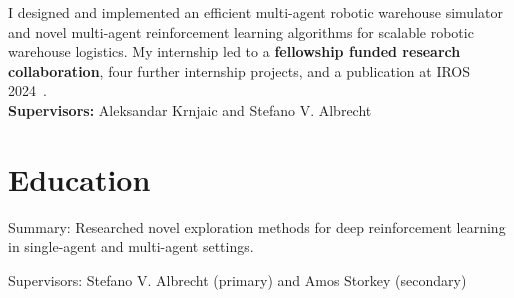 \documentclass[a4paper,12pt]{article}
\begin{document}
\begin{expblock}
    I designed and implemented an efficient multi-agent robotic warehouse simulator and novel multi-agent reinforcement learning algorithms for scalable robotic warehouse logistics. My internship led to a \textbf{fellowship funded research collaboration}, four further internship projects, and a publication at IROS 2024~\cite{krnjaic2024scalable}.\\
    \textbf{Supervisors:} Aleksandar Krnjaic and Stefano V. Albrecht
\end{expblock}

\section{Education}

\begin{expblock}
    \begin{explist}
	\item Summary: Researched novel exploration methods for deep reinforcement learning in single-agent and multi-agent settings.
	\item Supervisors: Stefano V. Albrecht (primary) and Amos Storkey (secondary)
    \end{explist}
\end{expblock}
\end{document}

